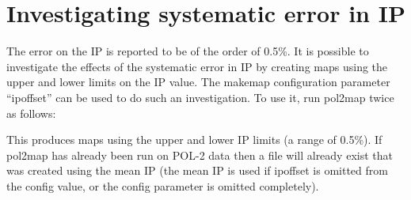 \section{Investigating systematic error in IP}


The error on the IP is reported to be of the order of 0.5\%.  It is
possible to investigate the effects of the systematic error in IP by
creating maps using the upper and lower limits on the IP value. The
makemap configuration parameter ``ipoffset'' can be used to do such an
investigation. To use it, run pol2map twice as follows:

\begin{terminalv}
\end{terminalv}

This produces maps using the upper and lower IP limits (a range of
0.5\%). If pol2map has already been run on POL-2 data then a file will
already exist that was created using the mean IP (the mean IP is used
if ipoffset is omitted from the config value, or the config parameter
is omitted completely).




